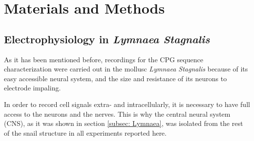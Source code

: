 \chapter{Materials and Methods}
\section{Electrophysiology in \textit{Lymnaea Stagnalis}}

\label{subsec:preparation}
As it has been mentioned before, recordings for the CPG sequence characterization were carried out in the mollusc \textit{Lymnaea Stagnalis} because of its easy accessible neural system, and the size and resistance of its neurons to electrode impaling.  

In order to record cell signals extra- and intracellularly, it is necessary to have full access to the neurons and the nerves. This is why the central neural system (CNS), as it was shown in section \ref{subsec: Lymnaea}, was isolated from the rest of the snail structure in all experiments reported here. 

